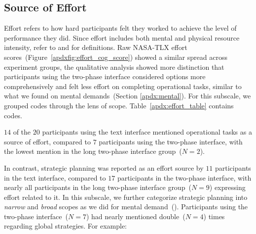 \subsection{Source of Effort}
\label{apdx:effort}
Effort refers to how hard participants felt they worked to achieve the level of performance they did. Since effort includes both mental and physical resource intensity, refer to  and  for definitions. Raw NASA-TLX effort scores~(Figure~\ref{apdxfig:effort_cog_score}) showed a similar spread across experiment groups, the qualitative analysis showed more distinction that participants using the two-phase interface considered options more comprehensively and felt less effort on completing operational tasks, similar to what we found on mental demands~(Section \ref{apdx:mental}). For this subscale, we grouped codes through the lens of scope. Table~\ref{apdx:effort_table} contains codes. 

$14$ of the $20$ participants using the text interface mentioned operational tasks as a source of effort, compared to $7$ participants using the two-phase interface, with the lowest mention in the long two-phase interface group~($N=2$).


In contrast, strategic planning was reported as an effort source by $11$ participants in the text interface, compared to $17$ participants in the two-phase interface, with nearly all participants in the long two-phase interface group~($N=9$) expressing effort related to it. In this subscale, we further categorize strategic planning into \textit{narrow} and \textit{broad} scopes as we did for mental demand~(). Participants using the two-phase interface~($N=7$) had nearly mentioned double~($N=4$) times regarding global strategies. For example:

